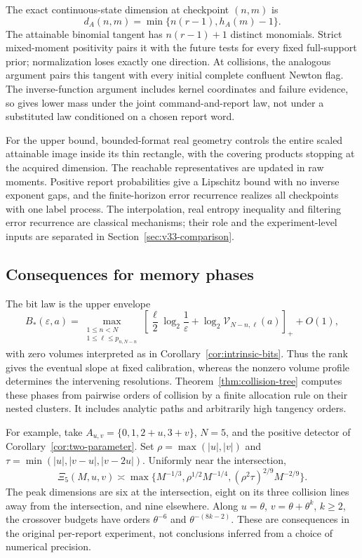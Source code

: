 The exact continuous-state dimension at checkpoint $(n,m)$ is
\[
                 d_A(n,m)=\min\{n(r-1),h_A(m)-1\}.
\]
The attainable binomial tangent has $n(r-1)+1$ distinct monomials.
Strict mixed-moment positivity pairs it with the future tests for every
fixed full-support prior; normalization loses exactly one direction.
At collisions, the analogous argument pairs this tangent with every
initial complete confluent Newton flag. The inverse-function argument
includes kernel coordinates and failure evidence, so gives lower mass
under the joint command-and-report law, not under a substituted law
conditioned on a chosen report word.

For the upper bound, bounded-format real geometry controls the entire
scaled attainable image inside its thin rectangle, with the covering
products stopping at the acquired dimension. The reachable representatives
are updated in raw moments. Positive report probabilities give a
Lipschitz bound with no inverse exponent gaps, and the finite-horizon
error recurrence realizes all checkpoints with one label process.
The interpolation, real entropy inequality and filtering error recurrence
are classical mechanisms; their role and the experiment-level inputs
are separated in Section~\ref{sec:v33-comparison}.

\subsection{Consequences for memory phases}
The bit law is the upper envelope
\[
 B_*(\varepsilon,a)=
 \max_{\substack{1\le n<N\\1\le\ell\le p_{n,N-n}}}
 \left[\frac\ell2\log_2\frac1\varepsilon+
             \log_2\mathcal V_{N-n,\ell}(a)\right]_++O(1),
\]
with zero volumes interpreted as in Corollary~\ref{cor:intrinsic-bits}.
Thus the rank gives the eventual slope at fixed calibration, whereas
the nonzero volume profile determines the intervening resolutions.
Theorem~\ref{thm:collision-tree} computes these phases from pairwise
orders of collision by a finite allocation rule on their nested clusters.
It includes analytic paths and arbitrarily high tangency orders.

For example, take $A_{u,v}=\{0,1,2+u,3+v\}$, $N=5$, and the positive
detector of Corollary~\ref{cor:two-parameter}. Set
$\rho=\max(|u|,|v|)$ and
$\tau=\min(|u|,|v-u|,|v-2u|)$. Uniformly near the intersection,
\[
 \Xi_5(M,u,v)\asymp
 \max\{M^{-1/3},\rho^{1/2}M^{-1/4},
                      (\rho^2\tau)^{2/9}M^{-2/9}\}.
\]
The peak dimensions are six at the intersection, eight on its three
collision lines away from the intersection, and nine elsewhere.
Along $u=\theta$, $v=\theta+\theta^k$, $k\ge2$, the crossover
budgets have orders $\theta^{-6}$ and $\theta^{-(8k-2)}$.
These are consequences in the original per-report experiment, not
conclusions inferred from a choice of numerical precision.

